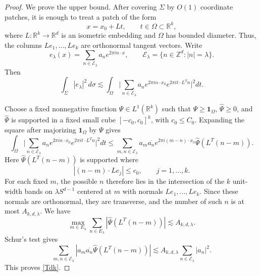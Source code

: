 \documentclass[11pt,reqno]{amsart}
\numberwithin{equation}{section}
\newcommand{\1}{\textbf{1}}
\newcommand{\ls}{\lesssim}
\newcommand{\la}{\lambda}
\newcommand{\E}{\mathcal{E}}
\begin{document}
	\begin{proof}
		We prove the upper bound. After covering $\Sigma$ by $O(1)$ coordinate patches, it is enough to treat a patch of the form
		\[
		x=x_0+Lt,
		\qquad t\in\Omega\subset\mathbb R^k,
		\]
		where $L:\mathbb R^k\to\mathbb R^d$ is an isometric embedding and $\Omega$ has bounded diameter. Thus, the columns $Le_1,\ldots,Le_k$ are orthonormal tangent vectors. Write
		\[
		e_\lambda(x)=\sum_{n\in \E_\lambda} a_n e^{2\pi i n\cdot x},
		\qquad \E_\lambda=\{n\in\mathbb Z^d: |n|=\lambda\}.
		\]
		Then
		\[
		\int_\Sigma |e_\lambda|^2\,d\sigma
		\ls
		\int_\Omega
		\Big|\sum_{n\in \E_\lambda}a_n e^{2\pi i n\cdot x_0}e^{2\pi i t\cdot L^Tn}\Big|^2dt.
		\]
		
		Choose a fixed nonnegative function $\Psi\in L^1(\mathbb R^k)$ such that $\Psi\ge \mathbf1_\Omega$, $\widehat\Psi\ge0$, and $\widehat\Psi$ is supported in a fixed small cube $[-c_0,c_0]^k$, with $c_0\le C_0$. Expanding the square after majorizing $\mathbf 1_\Omega$ by $\Psi$ gives
		\[
		\int_\Omega
		\Big|\sum_{n\in \E_\lambda}a_n e^{2\pi i n\cdot x_0}e^{2\pi i t\cdot L^Tn}\Big|^2dt
		\le
		\sum_{m,n\in \E_\lambda} a_m\overline{a_n}e^{2\pi i(m-n)\cdot x_0}\widehat\Psi(L^T(n-m)).
		\]
		Here $\widehat\Psi(L^T(n-m))$ is supported where
		\[
		|(n-m)\cdot Le_j|\le c_0,
		\qquad j=1,\ldots,k.
		\]
		For each fixed $m$, the possible $n$ therefore lies in the intersection of the $k$ unit-width bands on $\lambda S^{d-1}$ centered at $m$ with normals $Le_1,\ldots,Le_k$. Since these normals are orthonormal, they are transverse, and the number of such $n$ is at most $A_{k,d,\lambda}$. We have
		\[\max_{m\in E_\la}\sum_{n\in E_\la}|\widehat\Psi(L^T(n-m))|\ls A_{k,d,\la}.\]
		Schur's test gives
		\[
		\sum_{m,n\in \E_\lambda}\left|a_m\overline{a_n}\widehat\Psi(L^T(n-m))\right|
		\ls A_{k,d,\lambda}\sum_{n\in \E_\lambda}|a_n|^2.
		\]
		This proves \eqref{Tdk}.
		

\end{proof}
\end{document}
